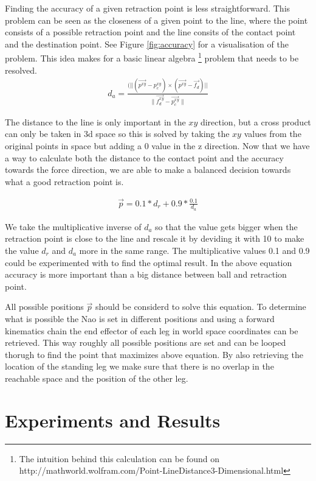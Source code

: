 \documentclass[a4paper]{article}
\begin{document}
Finding the accuracy of a given retraction point is less straightforward. This
problem can be seen as the closeness of a given point to the line, where the
point consists of a possible retraction point and the line consits of the
contact point and the destination point. See Figure \ref{fig:accuracy} for a
visualisation of the problem. This idea makes for a basic linear algebra
\footnote{The intuition behind this calculation can be found on http://mathworld.wolfram.com/Point-LineDistance3-Dimensional.html }
problem that needs to be resolved.
\begin{align*}
    d_a = \frac{(||(\vec{p^{xy}} - p_c^{xy}) \times (\vec{p^{xy}} -
    \vec{f_d})||}{\|\vec{f_d^{xy}}- \vec{p_c^{xy}}\|}
\end{align*}

The distance to the line is only important in the $xy$ direction, but a cross
product can only be taken in 3d space so this is solved by taking the $xy$
values from the original points in space but adding a 0 value in the z
direction.
Now that we have a way to calculate both the distance to the contact point and
the accuracy towards the force direction, we are able to make a balanced
decision towards what a good retraction point is.

\begin{align*}
    \vec{p} = 0.1 * d_r + 0.9 * \frac{0.1}{d_a}
\end{align*}

We take the multiplicative inverse of $d_a$ so that the value gets bigger when the
retraction point is close to the line and rescale it by deviding it with 10 to
make the value $d_r$ and $d_a$ more in the same range. The multiplicative values
0.1 and 0.9 could be experimented with to find the optimal result. In the above
equation accuracy is more important than a big distance between ball and
retraction point.

All possible positions $\vec{p}$ should be considerd to solve this equation. To
determine what is possible the Nao is set in different positions and using a
forward kinematics chain the end effector of each leg in world space coordinates
can be retrieved. This way roughly all possible positions are set and can be
looped thorugh to find the point that maximizes above equation. By also
retrieving the location of the standing leg we make sure that there is
no overlap in the reachable space and the position of the other leg.


\section{Experiments and Results}
\end{document}
